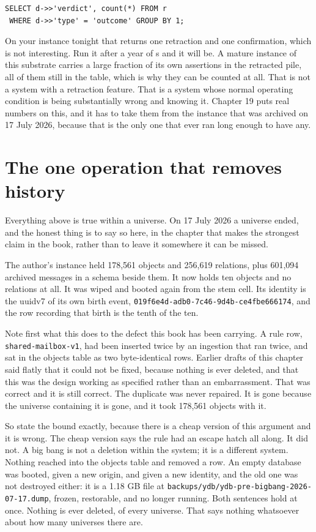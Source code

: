 \begin{verbatim}
SELECT d->>'verdict', count(*) FROM r
 WHERE d->>'type' = 'outcome' GROUP BY 1;
\end{verbatim}

On your instance tonight that returns one retraction and one confirmation, which is not interesting. Run it after a year of \labRun{}s and it will be. A mature instance of this substrate carries a large fraction of its own assertions in the retracted pile, all of them still in the table, which is why they can be counted at all. That is not a system with a retraction feature. That is a system whose normal operating condition is being substantially wrong and knowing it. Chapter 19 puts real numbers on this, and it has to take them from the instance that was archived on 17 July 2026, because that is the only one that ever ran long enough to have any.

\section{The one operation that removes history}

Everything above is true within a universe. On 17 July 2026 a universe ended, and the honest thing is to say so here, in the chapter that makes the strongest claim in the book, rather than to leave it somewhere it can be missed.

The author's instance held 178,561 objects and 256,619 relations, plus 601,094 archived messages in a schema beside them. It now holds ten objects and no relations at all. It was wiped and booted again from the stem cell. Its identity is the uuidv7 of its own birth event, \texttt{019f6e4d-adb0-7c46-9d4b-ce4fbe666174}, and the row recording that birth is the tenth of the ten.

Note first what this does to the defect this book has been carrying. A rule row, \texttt{shared-mailbox-v1}, had been inserted twice by an ingestion that ran twice, and sat in the objects table as two byte-identical rows. Earlier drafts of this chapter said flatly that it could not be fixed, because nothing is ever deleted, and that this was the design working as specified rather than an embarrassment. That was correct and it is still correct. The duplicate was never repaired. It is gone because the universe containing it is gone, and it took 178,561 objects with it.

So state the bound exactly, because there is a cheap version of this argument and it is wrong. The cheap version says the rule had an escape hatch all along. It did not. A big bang is not a deletion within the system; it is a different system. Nothing reached into the objects table and removed a row. An empty database was booted, given a new origin, and given a new identity, and the old one was not destroyed either: it is a 1.18 GB file at \texttt{backups/ydb/ydb-pre-bigbang-2026-07-17.dump}, frozen, restorable, and no longer running. Both sentences hold at once. Nothing is ever deleted, of every universe. That says nothing whatsoever about how many universes there are.

